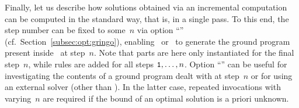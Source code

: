 Finally, let us describe how solutions obtained via an incremental computation
can be computed in the standard way, that is, in a single pass.
To this end, the step number can be fixed to some~$n$ via
option ``'' (cf.\ Section~\ref{subsec:opt:gringo}),
enabling \gringo\ or \clingo\ to generate the ground program present
inside \clingo\ at step~$n$.
Note that  parts are here only instantiated for the final step~$n$,
while  rules are added for all steps $\texttt{1},\dots,n$.
Option ``'' can be useful for investigating the contents
of a ground program dealt with at step~$n$ or for using an external solver
(other than \clasp).
In the latter case, repeated invocations with varying~$n$
are required if the bound of an optimal solution is a priori unknown.


